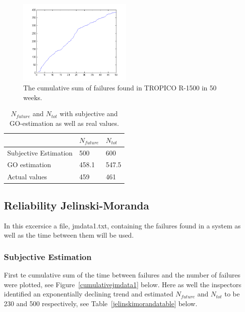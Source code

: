 \begin{figure}[htb!]
\begin{center}
	\includegraphics[width=0.5\textwidth]{cumsumgodata1plot.png}
\caption{The cumulative sum of failures found in TROPICO R-1500 in 50 weeks.}
\end{center}
\label{cumulativegodata1}
\end{figure}

\begin{table}[!htb]
	\centering
	\caption{$N_{future}$ and $N_{tot}$ with subjective and GO-estimation as well as real values.}
	\label{goelokumototable}	
    \begin{tabular}{|l|l|l|}
        \hline
        ~ & $N_{future}$ & $N_{tot}$ \\ \hline
        Subjective Estimation            & 500   & 600 		\\ 
        GO estimation                    & 458.1 & 547.5	\\ 
        Actual values                    & 459 	 & 461		\\ 
        \hline
    \end{tabular}
\end{table}

\subsection{Reliability Jelinski-Moranda}
In this excersice a file, jmdata1.txt, containing the failures found in a system as well as the time between them will be used.

\subsubsection*{Subjective Estimation} 
First te cumulative sum of the time between failures and the number of failures were plotted, see Figure~\ref{cumulativejmdata1} below. Here as well the inspectors identified an exponentially declining trend and estimated $N_{future}$ and $N_{tot}$ to be 230 and 500 respectively, see Table~\ref{jelinskimorandatable} below.

